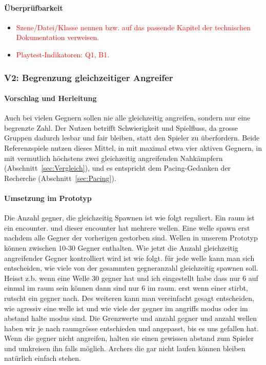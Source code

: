 \documentclass[../Main.tex]{subfiles}
\begin{document}
\paragraph{Überprüfbarkeit}
\begin{itemize}[leftmargin=1.5cm]
    \item \textcolor{red}{Szene/Datei/Klasse nennen bzw. auf das passende Kapitel der technischen Dokumentation verweisen.}
    \item \textcolor{red}{Playtest-Indikatoren: Q1, B1.}
\end{itemize}

\subsubsection{V2: Begrenzung gleichzeitiger Angreifer} \label{sec:V2}

\paragraph{Vorschlag und Herleitung}
Auch bei vielen Gegnern sollen nie alle gleichzeitig angreifen, sondern nur eine begrenzte Zahl. Der Nutzen betrifft Schwierigkeit und Spielfluss, da grosse Gruppen dadurch lesbar und fair bleiben, statt den Spieler zu überfordern. Beide Referenzspiele nutzen dieses Mittel, in  mit maximal etwa vier aktiven Gegnern, in  mit vermutlich höchstens zwei gleichzeitig angreifenden Nahkämpfern (Abschnitt~\ref{sec:Vergleich}), und es entspricht dem Pacing-Gedanken der Recherche (Abschnitt~\ref{sec:Pacing}).

\paragraph{Umsetzung im Prototyp}

Die Anzahl gegner, die gleichzeitig Spawnen ist wie folgt reguliert. Ein raum ist ein encounter. und dieser encounter hat mehrere wellen. Eine welle spawn erst nachdem alle Gegner der vorherigen gestorben sind. Wellen in unserem Prototyp können zwischen 10-30 Gegner enthalten. Wie jetzt die Anzahl gleichzeitig angreifender Gegner kontrolliert wird ist wie folgt. für jede welle kann man sich entscheiden, wie viele von der gesammten gegneranzahl gleichzeitig spawnen soll. Heisst z.b. wenn eine Welle 30 gegner hat und ich eingestellt habe dass nur 6 auf einmal im raum sein können dann sind nur 6 im raum. erst wenn einer stirbt, rutscht ein gegner nach. Des weiteren kann man vereinfacht gesagt entscheiden, wie agressiv eine welle ist und wie viele der gegner im angriffs modus oder im abstand halte modus sind. Die Grenzwerte und anzahl gegner und anzahl wellen haben wir je nach raumgrösse entschieden und angepasst, bis es uns gefallen hat. Wenn die gegner nicht angreifen, halten sie einen gewissen abstand zum Spieler und umkreisen ihn falls möglich. Archers die gar nicht laufen können bleiben natürlich einfach stehen.
\end{document}

